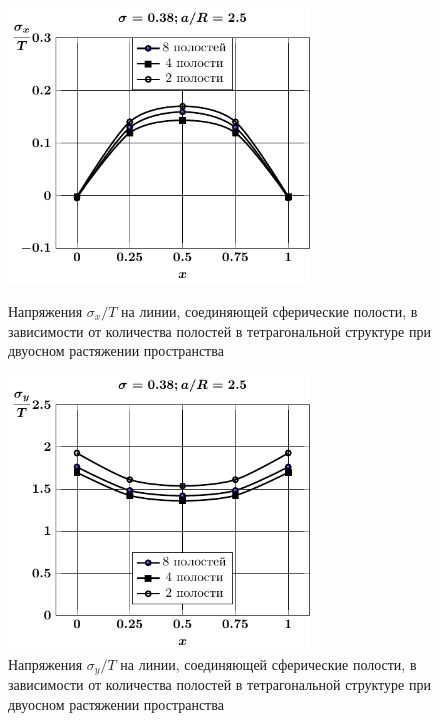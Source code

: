\begin{russian}
\begin{figure}[h!]
\centering\footnotesize
\parbox[b]{7.5cm}{\centering\includegraphics[width=8cm]{cav8-4-2-sig_x-spheres-tension2.pdf}
\caption{Напряжения $\sigma_x/T$ на линии, соединяющей сферические полости, в зависимости от количества полостей в тетрагональной структуре при двуосном растяжении пространства
\label{f:8:12}}}\hfil\hfil
\parbox[b]{7.5cm}{\centering\includegraphics[width=8cm]{cav8-4-2-sig_y-spheres-tension2.pdf}
\caption{Напряжения $\sigma_y/T$ на линии, соединяющей сферические полости, в зависимости от количества полостей в тетрагональной структуре при двуосном растяжении пространства
\label{f:8:13}}}
\end{figure}

%


\end{russian}
